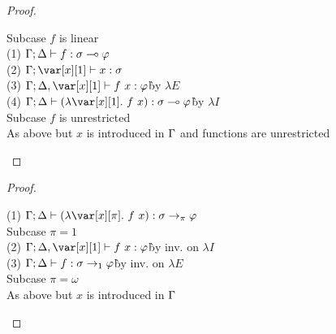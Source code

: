 \EtaExpansionTheorem

\begin{proof}~
\begin{tabbing}
    Subcase $f$ is linear\\
    (1) $\Gamma; \Delta \vdash f : \sigma \multimap \varphi$\\
    (2) $\G; \xl \vdash x : \s$\\
    (3) $\G; \D, \xl \vdash f~x : \vp$\`by $\lambda E$\\
    (4) $\G; \D \vdash (\lambda \xl.~f~x) : \s \lolli \vp$\`by $\lambda I$\\
    Subcase $f$ is unrestricted\\
    As above but $x$ is introduced in $\Gamma$ and functions are unrestricted
\end{tabbing}
\end{proof}

\EtaReductionTheorem

\begin{proof}~
\begin{tabbing}
    (1) $\G; \D \vdash (\lambda \x[\pi].~f~x) : \s \to_\pi \vp$\\
    Subcase $\pi = 1$\\
    (2) $\G; \D, \xl \vdash f~x : \vp$\`by inv. on $\lambda I$\\
    (3) $\Gamma; \Delta \vdash f : \sigma \to_1 \varphi$\`by inv. on $\lambda E$\\
    Subcase $\pi = \omega$\\
    As above but $x$ is introduced in $\Gamma$
\end{tabbing}
\end{proof}

